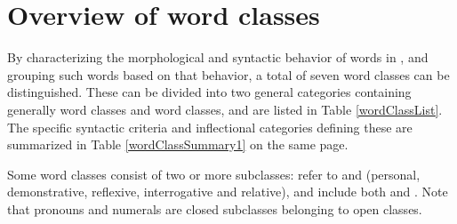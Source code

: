 \section{Overview of word classes}\label{introWordForms}
By characterizing the morphological and syntactic behavior of words in \PS, and grouping such words based on that behavior, a total of seven word classes can be distinguished. These can be divided into two general categories containing generally  word classes and  word classes, and are listed in Table \vref{wordClassList}. 
The specific syntactic criteria and inflectional categories defining these are summarized in Table \ref{wordClassSummary1} on the same page. %

Some word classes consist of two or more subclasses: 
 refer to  %
and  (personal, demonstrative, reflexive, interrogative and relative), and  include both  and . %
Note that pronouns and numerals are closed subclasses belonging to open classes.

